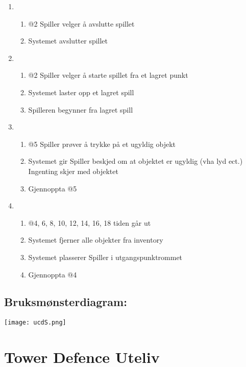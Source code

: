 \documentclass[12pt]{report}
\begin{document}
\begin{enumerate}[label=\Alph*]
\item 
\bigskip

\begin{enumerate}
\item @2 Spiller velger {\aa} avslutte spillet
\item Systemet avslutter spillet
\end{enumerate}
\item 
\bigskip

\begin{enumerate}
\item @2 Spiller velger {\aa} starte spillet fra et lagret punkt
\item Systemet laster opp et lagret spill
\item Spilleren begynner fra lagret spill
\end{enumerate}
\item 
\bigskip

\begin{enumerate}
\item @5 Spiller pr{\o}ver {\aa} trykke p{\aa} et ugyldig objekt
\item Systemet gir Spiller beskjed om at objektet er ugyldig (vha lyd ect.) Ingenting skjer med objektet
\item Gjennoppta @5
\end{enumerate}
\item 
\bigskip

\begin{enumerate}
\item @4, 6, 8, 10, 12, 14, 16, 18 tiden g{\aa}r ut
\item Systemet fjerner alle objekter fra inventory
\item Systemet plasserer Spiller i utgangspunktrommet
\item Gjennoppta @4
\end{enumerate}
\end{enumerate}

\subsection*{Bruksm{\o}nsterdiagram:}

\texttt{[image: ucdS.png]}



\section*{Tower Defence Uteliv}
\end{document}
